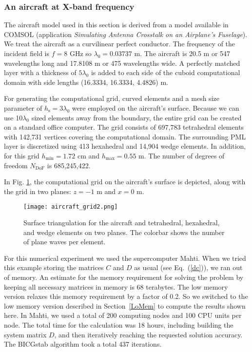 \documentclass[a4paper,12pt]{article}
\newcommand{\hs}{h_{\mathrm{s}}}
\newcommand{\Ndof}{N_{\mathrm{DoF}}}
\begin{document}
\subsubsection{An aircraft at X-band frequency}\label{Aircraft}

The aircraft model used in this section is derived from a model available in COMSOL (application \emph{Simulating Antenna Crosstalk on an Airplane’s Fuselage}).  We treat the aircraft as a curvilinear perfect conductor.  The frequency of the incident field is $f = 8$ GHz so $\lambda_0=0.03737$ m. The aircraft is 20.5 m or 547 wavelengths long and 17.8108 m or 475 wavelengths wide. A perfectly matched layer with a thickness of $5\lambda_0$ is added to each side of the cuboid computational domain with side lengths (16.3334, 16.3334, 4.4826) m. 

For generating the computational grid, curved elements and a mesh size
parameter of $\hs=3\lambda_0$ were employed on the aircraft's surface.
Because we can use 10$\lambda_0$ sized elements away from the
boundary, the entire grid can be created on a standard office
computer. The grid consists of 697,783 tetrahedral elements with
142,731 vertices covering the computational domain. The surrounding
PML layer is discretized using 413 hexahedral and 14,904 wedge
elements. In addition, for this grid $h_{\min} = 1.72$ cm and
$h_{\max} = 0.55$ m. The number of degrees of freedom $\Ndof$ is
  685,245,422.

In Fig. \ref{fig:aircraft_grid}, the computational grid on the
aircraft's surface is depicted, along with the grid in two planes:
$z=-1$ m and $x=0$ m.

\begin{figure}[!htb]
    \centering
    \texttt{[image: aircraft\_grid2.png]} 
\caption{Surface triangulation for the aircraft and tetrahedral, hexahedral, and wedge elements on two planes. The colorbar shows the number of plane waves per element. }
    \label{fig:aircraft_grid}
\end{figure}

For this numerical experiment we used the supercomputer Mahti. When we
tried this example storing the matrices $C$ and $D$ as usual (see
Eq.~(\ref{dc})), we ran out of memory. An estimate for the memory
requirement for solving the problem by keeping all necessary matrices
in memory is 68 terabytes. The low memory version relaxes this memory
requirement by a factor of 0.2. So we switched to the low memory
version described in Section~\ref{LoMem} to compute the results shown
here. In Mahti, we used a total of 200 computing nodes and 100 CPU
units per node. The total time for the calculation was 18 hours,
including building the system matrix $D$, and then iteratively
reaching the requested solution accuracy. The BICGstab algorithm took
a total 437 iterations.
\end{document}
